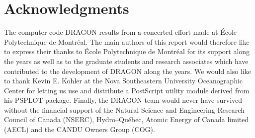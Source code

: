 \section*{Acknowledgments}

The computer code DRAGON results from a concerted effort made at \'{E}cole Polytechnique de
Montr\'{e}al. The main authors of this  report would therefore like to express their thanks to
\'{E}cole Polytechnique de Montr\'{e}al for its support along the years as well as to
the graduate students and research associates which have contributed to the development of
DRAGON along the years. We would also like to thank Kevin E. Kohler at the Nova Southeastern University
Oceanographic Center  for letting us use and distribute a PostScript utility module derived from his
PSPLOT package. Finally, the DRAGON  team would never have survived without  the financial
support of the  Natural Science and Engineering Research Council of Canada (NSERC),
Hydro--Qu\'{e}bec,  Atomic Energy of Canada limited (AECL) and the CANDU Owners Group (COG). 





